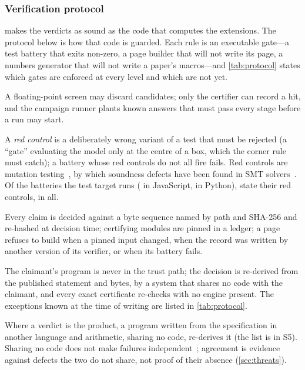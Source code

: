 \documentclass[preprint,11pt,a4paper]{elsarticle}
\theoremstyle{definition}
\newcommand{\supp}[1]{S#1}
\begin{document}
\subsubsection{Verification protocol}\label{sec:protocol}
 makes the verdicts as sound as the code that computes the extensions. The protocol below is how that code is guarded. Each rule is an executable gate---a test battery that exits non-zero, a page builder that will not write its page, a numbers generator that will not write a paper's macros---and \cref{tab:protocol} states which gates are enforced at every level and which are not yet.
\begin{description}\setlength{\itemsep}{1pt}
\item[R1. Screens prune, never admit.] A floating-point screen may discard candidates; only the certifier can record a hit, and the campaign runner plants known answers that must pass every stage before a run may start.
\item[R2. Adversarial controls must fire.] A \emph{red control} is a deliberately wrong variant of a test that must be rejected (a ``gate'' evaluating the model only at the centre of a box, which the corner rule must catch); a battery whose red controls do not all fire fails. Red controls are mutation testing~\citep{DeMillo78,JiaHarman11,Petrovic18}, by which soundness defects have been found in SMT solvers~\citep{Winterer20,Mansur20}. Of the \MtBatteries{} batteries the test target runs (\MtBatteriesNode{} in JavaScript, \MtBatteriesPy{} in Python), \MtEvRedBatteries{} state their red controls, \MtEvRedTotal{} in all.
\item[R3. Pin the bytes.] Every claim is decided against a byte sequence named by path and SHA-256 and re-hashed at decision time; certifying modules are pinned in a ledger; a page refuses to build when a pinned input changed, when the record was written by another version of its verifier, or when its battery fails.
\item[R4. Independence from the claimant.] The claimant's program is never in the trust path; the decision is re-derived from the published statement and bytes, by a system that shares no code with the claimant, and every exact certificate re-checks with no engine present. The exceptions known at the time of writing are listed in \cref{tab:protocol}.
\item[R5. Second implementations.] Where a verdict is the product, a program written from the specification in another language and arithmetic, sharing no code, re-derives it (the list is in \supp{5}). Sharing no code does not make failures independent~\citep{KnightLeveson86,Nogueira26,Ron26}; agreement is evidence against defects the two do not share, not proof of their absence (\cref{sec:threats}).

\end{description}
\end{document}
